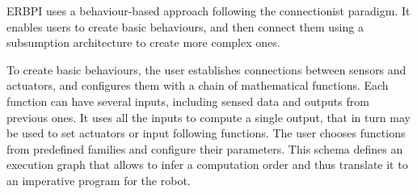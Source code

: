 

 


ERBPI uses a behaviour-based approach following the connectionist paradigm. It enables users to create basic behaviours, and then connect them using a subsumption architecture to create more complex ones. 

To create basic behaviours, the user establishes connections between sensors and actuators, and configures them with a chain of mathematical functions.  Each function can have several inputs, including sensed data and outputs from previous ones. It uses all the inputs to compute a single output, that in turn may be used to set actuators or input following functions. The user chooses functions from predefined families and configure their parameters. %
This schema defines an execution graph that allows to infer a computation order and thus translate it to an imperative program for the robot. 

